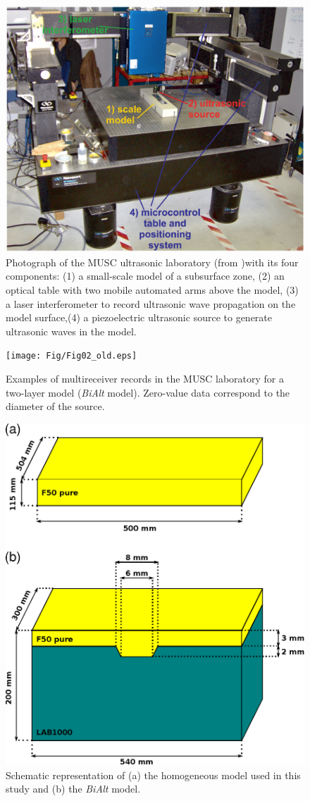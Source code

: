 \documentclass[extra,mreferee]{gji}
\newcommand{\bialt}{\textit{BiAlt} }
\begin{document}
\begin{figure}
\centering
\includegraphics[width=0.50\columnwidth]{Fig/Fig01.eps}
\caption{Photograph of the MUSC ultrasonic laboratory (from \cite{bretaudeau2013fwi} )with its four components: (1) a small-scale model of a subsurface zone, (2) an optical table with two mobile automated arms above the model, (3) a laser interferometer to record ultrasonic wave propagation on the model surface,(4) a piezoelectric ultrasonic source to generate ultrasonic waves in the model.}
\label{Fig:Fig01}
\end{figure}

\clearpage
\newpage

\begin{figure}
\centering
\texttt{[image: Fig/Fig02\_old.eps]}
\caption{Examples of multireceiver records in the MUSC laboratory for a two-layer model (\bialt model). Zero-value data correspond to the diameter of the source.}
\label{Fig:Fig02}
\end{figure}

\clearpage
\newpage

\begin{figure}
\centering
\includegraphics[width=0.50\columnwidth]{Fig/Fig03.eps}
\caption{Schematic representation of (a) the homogeneous model used in this study and (b) the \bialt model.}
\label{Fig:Fig03}
\end{figure}
\end{document}
